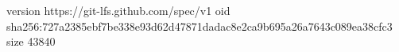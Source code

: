 version https://git-lfs.github.com/spec/v1
oid sha256:727a2385ebf7be338e93d62d47871dadac8e2ca9b695a26a7643c089ea38cfc3
size 43840
